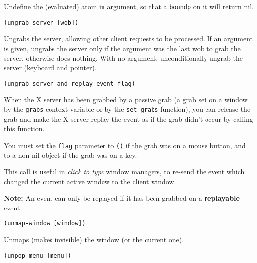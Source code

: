 Undefine the (evaluated) atom in argument, so that a \verb"boundp" on it will
return nil.

        
{\usagefont\begin{verbatim}
(ungrab-server [wob])
\end{verbatim}}\usageupspace

Ungrabs the server, allowing other client requests to be processed.
If an argument is given, ungrabs the server only if the argument was the
last wob to grab the server, otherwise does nothing. With no argument, 
unconditionally ungrab the server (keyboard and pointer).


{\usagefont\begin{verbatim}
(ungrab-server-and-replay-event flag)
\end{verbatim}}\usageupspace

When the X server has been grabbed by a passive grab (a grab set on a
window by the \verb"grabs" context variable or by the \verb"set-grabs"
function), you can release the grab and make the X server replay the event
as if the grab didn't occur by calling this function.

You must set the \verb"flag" parameter to \verb"()" if the grab was on a
mouse button, and to a non-nil object if the grab was on a key.

This call is useful in {\em click to type} window managers, to re-send the
event which changed the current active window to the client window.

{\bf Note:} An event can only be replayed if it has been grabbed on a
{\bf replayable} event .

        
{\usagefont\begin{verbatim}
(unmap-window [window])
\end{verbatim}}\usageupspace

Unmaps (makes invisible) the window (or the current one).

        
{\usagefont\begin{verbatim}
(unpop-menu [menu])
\end{verbatim}}\usageupspace

